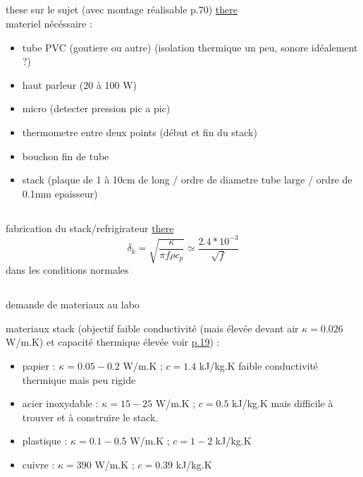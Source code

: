 \documentclass[11pt,a4paper]{article}
\begin{document}
	\subsection{}
		these sur le sujet (avec montage réalisable p.70) \href{file:///home/tamary/Downloads/th%C3%A8se%20r%C3%A9frig%C3%A9rateur%20thermoacoustique%20-%20Biblioth%C3%A8que%20Ecole%20Centrale%20....pdf}{there}\\
		materiel nécéssaire : 
		\begin{itemize}		
			\item tube PVC (goutiere ou autre) (isolation thermique un peu, sonore idéalement ?)
			\item haut parleur (20 à 100 W)
			\item micro (detecter pression pic a pic)
			\item thermometre entre deux points (début et fin du stack)
			\item bouchon fin de tube
			\item stack (plaque de 1 à 10cm de long / ordre de diametre tube large / ordre de 0.1mm epaisseur)
		\end{itemize}
		
	\subsection{}
		fabrication du stack/refrigirateur \href{https://www.acs.psu.edu/drussell/publications/thermodemo.pdf}{there}\\
		\[\delta_k=\sqrt{\frac{\kappa}{\pi f\rho c_p}}\simeq \frac{2.4 * 10^{-3}}{\sqrt{f}}\]
		dans les conditions normales 
		
	\subsection{}
		demande de materiaux au labo
		
		materiaux stack (objectif faible conductivité (mais élevée devant air $\kappa=0.026$W/m.K) et capacité thermique élevée voir 
		\href{https://perso.univ-lemans.fr/~gpenelet/enseignement/support_cours/poly_thermoac.pdf}{p.19}) : 
		\begin{itemize}		
			\item papier : $\kappa=0.05-0.2$ W/m.K ; $c=1.4$ kJ/kg.K faible conductivité thermique mais peu rigide
			\item acier inoxydable : $\kappa=15-25$ W/m.K ; $c=0.5$ kJ/kg.K mais difficile à trouver et à construire le stack.
			\item plastique : $\kappa=0.1-0.5$ W/m.K ; $c=1-2$ kJ/kg.K
			\item  cuivre : $\kappa=390$ W/m.K ; $c=0.39$ kJ/kg.K
		\end{itemize}
		
\end{document}
